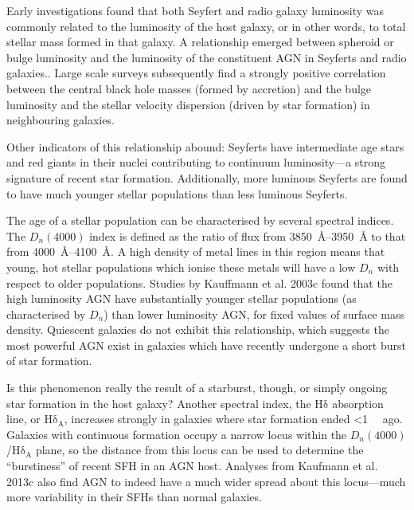 \documentclass[a4paper,11pt]{article}
\begin{document}
Early investigations found that both Seyfert and radio galaxy luminosity was commonly related to the luminosity of the host galaxy, or in other words, to total stellar mass formed in that galaxy. A relationship emerged between spheroid or bulge luminosity and the luminosity of the constituent AGN in Seyferts and radio galaxies.\cite{Lawrence_1987}. Large scale surveys subsequently find a strongly positive correlation between the central black hole masses (formed by accretion) and the bulge luminosity and the stellar velocity dispersion (driven by star formation) in neighbouring galaxies.\cite{Veilleux_2008}

Other indicators of this relationship abound: Seyferts have intermediate age stars and red giants in their nuclei contributing to continuum luminosity---a strong signature of recent star formation. Additionally, more luminous Seyferts are found to have much younger stellar populations than less luminous Seyferts.\cite{Veilleux_2008}

The age of a stellar population can be characterised by several spectral indices. The $D_n(4000)$ index is defined as the ratio of flux from \SIrange{3850}{3950}{\angstrom} to that from \SIrange{4000}{4100}{\angstrom}. A high density of metal lines in this region means that young, hot stellar populations which ionise these metals will have a low $D_n$ with respect to older populations.\cite{Kauffmann_2003a} Studies by Kauffmann et al. 2003c found that the high luminosity AGN have substantially younger stellar populations (as characterised by $D_n$) than lower luminosity AGN, for fixed values of surface mass density. Quiescent galaxies do not exhibit this relationship, which suggests the most powerful AGN exist in galaxies which have recently undergone a short burst of star formation.\cite{Kauffmann_2003c}

Is this phenomenon really the result of a starburst, though, or simply ongoing star formation in the host galaxy? Another spectral index, the $\mathrm{H\delta}$ absorption line, or $\mathrm{H\delta_A}$, increases strongly in galaxies where star formation ended \textless \SI{1}{\giga\year} ago. Galaxies with continuous formation occupy a narrow locus within the $D_n(4000)$/$\mathrm{H\delta_A}$ plane, so the distance from this locus can be used to determine the ``burstiness'' of recent SFH in an AGN host. Analyses from Kaufmann et al. 2013c also find AGN to indeed have a much wider spread about this locus---much more variability in their SFHs than normal galaxies.\cite{Kauffmann_2003c}
\end{document}

